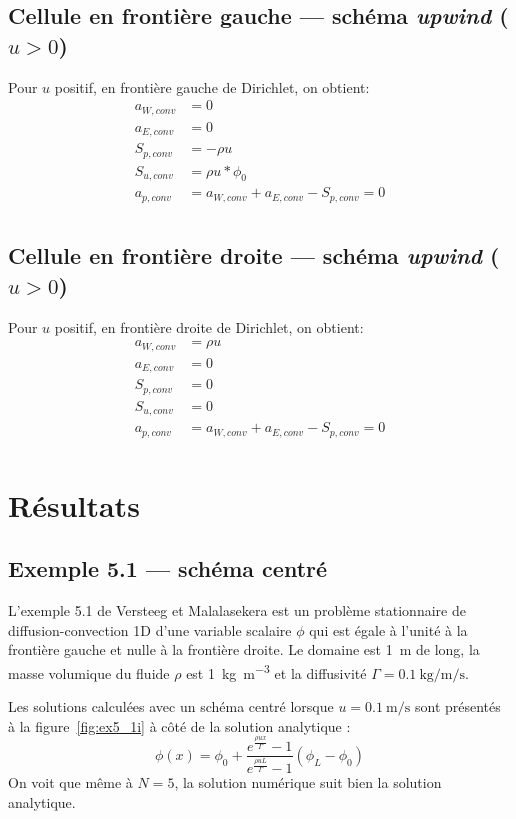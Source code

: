 \documentclass[12pt]{article}
\begin{document}
\subsection{Cellule en frontière gauche --- schéma \emph{upwind} ($u>0$)}

Pour $u$ positif, en frontière gauche de Dirichlet, on obtient:
\begin{align}
	a_{W,conv} &= 0 \\
	a_{E,conv} &= 0 \\
	S_{p,conv} &= -\rho u \\
	S_{u,conv} &= \rho u * \phi_0 \\
	a_{p,conv} &= a_{W,conv} + a_{E,conv} - S_{p,conv} = 0 \\
\end{align}

\subsection{Cellule en frontière droite --- schéma \emph{upwind} ($u>0$)}

Pour $u$ positif, en frontière droite de Dirichlet, on obtient:
\begin{align}
	a_{W,conv} &= \rho u \\
	a_{E,conv} &= 0 \\
	S_{p,conv} &= 0 \\
	S_{u,conv} &= 0 \\
	a_{p,conv} &= a_{W,conv} + a_{E,conv} - S_{p,conv} = 0 \\
\end{align}


\section{Résultats}

\subsection{Exemple 5.1 --- schéma centré}
L'exemple 5.1 de Versteeg et Malalasekera est un problème stationnaire
de diffusion-convection 1D d'une variable scalaire $\phi$ qui est égale
à l'unité à la frontière gauche et nulle à la frontière droite. Le domaine
est \SI{1}{m} de long, la masse volumique du fluide $\rho$ est
\SI{1}{\kg\per\m\cubed} et la diffusivité $\Gamma = \SI{0.1}{\kg\per\m\per\s}$.

Les solutions calculées avec un schéma centré lorsque $u = \SI{0.1}{\m\per\s}$
sont présentés à la figure~\ref{fig:ex5_1i} à côté de la solution analytique :
\begin{equation}
	\phi(x) = \phi_0 + \frac{e^{\frac{\rho ux}{\Gamma}} - 1}{
	e^{\frac{\rho uL}{\Gamma}} - 1} \left(\phi_L - \phi_0 \right)
\end{equation}
On voit que même à $N = 5$, la solution numérique suit bien la solution analytique.
\end{document}
